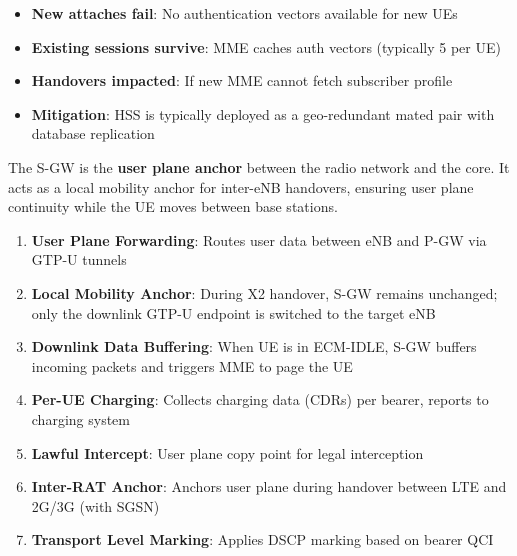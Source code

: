 \begin{itemize}
\tightlist
\item
  \textbf{New attaches fail}: No authentication vectors available for new UEs
\item
  \textbf{Existing sessions survive}: MME caches auth vectors (typically 5 per UE)
\item
  \textbf{Handovers impacted}: If new MME cannot fetch subscriber profile
\item
  \textbf{Mitigation}: HSS is typically deployed as a geo-redundant mated pair with database replication
\end{itemize}



\CNchained{}

The S-GW is the \textbf{user plane anchor} between the radio network and the core. It acts as a local mobility anchor for inter-eNB handovers, ensuring user plane continuity while the UE moves between base stations.


\begin{enumerate}
\def\labelenumi{\arabic{enumi}.}
\tightlist
\item
  \textbf{User Plane Forwarding}: Routes user data between eNB and P-GW via GTP-U tunnels
\item
  \textbf{Local Mobility Anchor}: During X2 handover, S-GW remains unchanged; only the downlink GTP-U endpoint is switched to the target eNB
\item
  \textbf{Downlink Data Buffering}: When UE is in ECM-IDLE, S-GW buffers incoming packets and triggers MME to page the UE
\item
  \textbf{Per-UE Charging}: Collects charging data (CDRs) per bearer, reports to charging system
\item
  \textbf{Lawful Intercept}: User plane copy point for legal interception
\item
  \textbf{Inter-RAT Anchor}: Anchors user plane during handover between LTE and 2G/\allowbreak{}3G (with SGSN)
\item
  \textbf{Transport Level Marking}: Applies DSCP marking based on bearer QCI
\end{enumerate}



